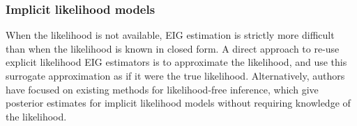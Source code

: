 \documentclass[a4paper, 10pt]{report}
\theoremstyle{plain}
\begin{document}
	
	
	
	\subsubsection{Implicit likelihood models}
	When the likelihood is not available, EIG estimation is strictly more difficult than when the likelihood is known in closed form.
	A direct approach to re-use explicit likelihood EIG estimators is to approximate the likelihood, and use this surrogate approximation as if it were the true likelihood.
	Alternatively, authors have focused on existing methods for likelihood-free inference, which give posterior estimates for implicit likelihood models without requiring knowledge of the likelihood. 
	
\end{document}
